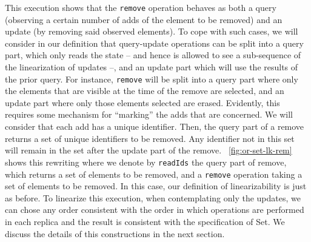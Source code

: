 This execution shows that 
the \lstinline|remove| operation behaves as both a query
(observing a certain number of adds of the element to be removed)
and an update (by removing said observed elements).
%
To cope with such cases, we will consider in our definition that
query-update operations can be split into a query part, which only
reads the state -- and hence is allowed to see a sub-sequence of the
linearization of updates --, and an update part which will use the
results of the prior query.
%
For instance, \lstinline|remove| will be split into a query part where
only the elements that are visible at the time of the remove are
selected, and an update part where only those elements selected are
erased.
%
Evidently, this requires some mechanism for ``marking'' the adds that
are concerned.
%
We will consider that each add has a unique identifier.
%
Then, the query part of a remove returns a set of unique identifiers
to be removed.
%
Any identifier not in this set will remain in the set after the update
part of the remove.
%
\figureautorefname~\ref{fig:or-set-lk-rem} shows this rewriting
where we denote by \lstinline|readIds| the query part of
remove, which returns a set of elements to be removed, and a
\lstinline|remove| operation taking a set of elements to be removed.
%
In this case, our definition of linearizability is just as before.
%
To linearize this execution, when contemplating only the updates, we
can chose any order consistent with the order in which operations are
performed in each replica and the result is consistent with the
specification of Set.
%
We discuss the details of this constructions in the next section.

